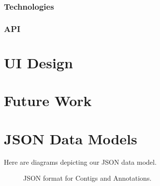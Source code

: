 \documentclass[10pt, conference, compsocconf]{IEEEtran}
\begin{document}
\subsubsection{Technologies}

\subsubsection{API}

\section{UI Design}\label{sec:ui}

\section{Future Work}\label{sec:future}






\onecolumn
\appendices

\section{JSON Data Models}\label{sec:data_models}
\centering
Here are diagrams depicting our JSON data model.

\begin{figure}[h]
   \centering
   \caption{JSON format for Contigs and Annotations.}
\end{figure}
\end{document}
